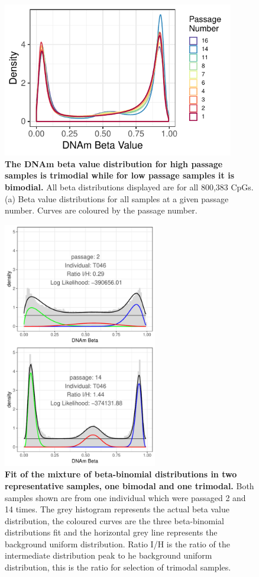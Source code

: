 \documentclass[a4paper]{article}
\begin{document}
\begin{figure}
\includegraphics[width=0.90\textwidth]{../figs/Passage_all_CpGs.pdf}
\caption{\textbf{The DNAm beta value distribution for high passage samples is trimodial while for low passage samples it is bimodial.} All beta distributions displayed are for all  800,383 CpGs. (a) Beta value distributions for all samples at a given passage number. Curves are coloured by the passage number.}
\end{figure}

\begin{figure}
\includegraphics[width=0.6\textwidth]{../figs/Mix_model_Paired.pdf}
\caption{\textbf{Fit of the mixture of beta-binomial distributions in two representative samples, one bimodal and one trimodal.} Both samples shown are from one individual which were passaged 2 and 14 times. The grey histogram represents the actual beta value distribution, the coloured curves are the three beta-binomial distributions fit and the horizontal grey line represents the background uniform distribution. Ratio I/H is the ratio of the intermediate distribution peak to he background uniform distribution, this is the ratio for selection of trimodal samples.}
\end{figure}
\end{document}
